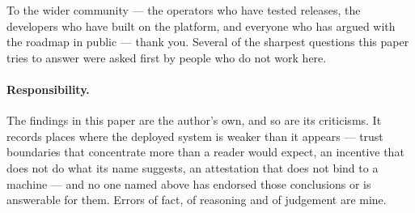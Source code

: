 To the wider \Flux{} community --- the operators who have tested releases, the developers who have
built on the platform, and everyone who has argued with the roadmap in public --- thank you. Several
of the sharpest questions this paper tries to answer were asked first by people who do not work here.

\paragraph{Responsibility.} The findings in this paper are the author's own, and so are its
criticisms. It records places where the deployed system is weaker than it appears --- trust
boundaries that concentrate more than a reader would expect, an incentive that does not do what its
name suggests, an attestation that does not bind to a machine --- and no one named above has
endorsed those conclusions or is answerable for them. Errors of fact, of reasoning and of judgement
are mine.
